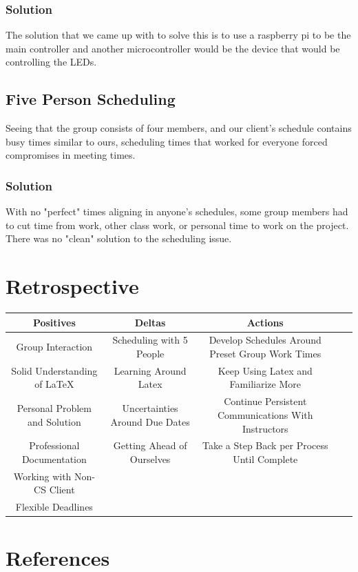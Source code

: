 \documentclass[onecolumn, draftclsnofoot,10pt, compsoc]{IEEEtran}
\begin{document}
		  	\subsubsection{Solution}
		    The solution that we came up with to solve this is to use a raspberry pi to
		    be the main controller and another microcontroller would be the device that
		    would be controlling the LEDs.
		 \subsection{Five Person Scheduling}
		 Seeing that the group consists of four members, and our client's schedule contains busy times similar to ours, scheduling times that worked for everyone
		 forced compromises in meeting times.
		 	  \subsubsection{Solution}
			  With no "perfect" times aligning in anyone's schedules, some group members had to cut time from work, other class work, or personal time to work on the project.
			  There was no "clean" solution to the scheduling issue.


	\section{Retrospective}
	\begin{tabular}{ |c|c|c|c|c| }
		\hline
		Positives & Deltas & Actions \\
		\hline
		Group Interaction & Scheduling with 5 People & Develop Schedules Around Preset Group Work Times \\
		Solid Understanding of LaTeX & Learning Around Latex & Keep Using Latex and Familiarize More \\
		Personal Problem and Solution & Uncertainties Around Due Dates & Continue Persistent Communications With Instructors \\
		Professional Documentation & Getting Ahead of Ourselves & Take a Step Back per Process Until Complete \\
		Working with Non-CS Client & & \\
		Flexible Deadlines & &  \\
		\hline
	\end{tabular}

	\section{References}
			\begingroup
				\renewcommand{\addcontentsline}[3]{}%
				\renewcommand{\section}[2]{}%
				
				
			\endgroup
\end{document}
